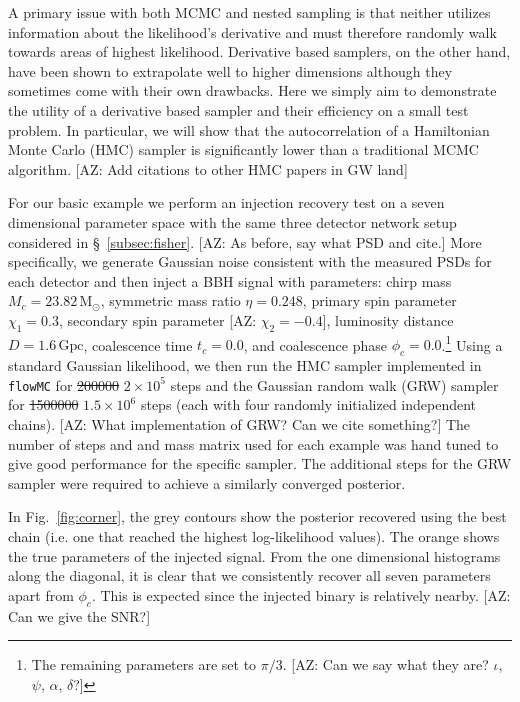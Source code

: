 \documentclass[twocolumn]{aastex631}
\newcommand{\flowMC}{\texttt{flowMC}\xspace}
\newcommand{\AZ}[1]{{\color{Burnt}[AZ: #1]}}
\begin{document}
A primary issue with both MCMC and nested sampling is that neither utilizes information about the likelihood's derivative and must therefore randomly walk towards areas of highest likelihood.
Derivative based samplers, on the other hand, have been shown to extrapolate well to higher dimensions although they sometimes come with their own drawbacks.
Here we simply aim to demonstrate the utility of a derivative based sampler and their efficiency on a small test problem.
In particular, we will show that the autocorrelation of a Hamiltonian Monte Carlo (HMC) sampler is significantly lower than a traditional MCMC algorithm.
\AZ{Add citations to other HMC papers in GW land}

For our basic example we perform an injection recovery test on a seven dimensional parameter space with the same three detector network setup considered in \S~\ref{subsec:fisher}.
\AZ{As before, say what PSD and cite.}
More specifically, we generate Gaussian noise consistent with the measured PSDs for each detector and then inject a BBH signal with parameters: chirp mass $M_c = 23.82\,\mathrm{M_\odot}$,  symmetric mass ratio $\eta = 0.248$, primary spin parameter $\chi_1=0.3$, secondary spin parameter \AZ{$\chi_2=-0.4$}, luminosity distance $D = 1.6\,\mathrm{Gpc}$, coalescence time $t_c = 0.0$, and coalescence phase $\phi_c = 0.0$.\footnote{
    The remaining parameters are set to $\pi/3$. \AZ{Can we say what they are? $\iota$, $\psi$, $\alpha$, $\delta$?}
}
Using a standard Gaussian likelihood, we then run the HMC sampler implemented in \flowMC for \sout{200000} $2\times10^5$ steps and the Gaussian random walk (GRW) sampler for \sout{1500000} $1.5\times10^6$ steps (each with four randomly initialized independent chains). 
\AZ{What implementation of GRW? Can we cite something?}
The number of steps and and mass matrix used for each example was hand tuned to give good performance for the specific sampler.
The additional steps for the GRW sampler were required to achieve a similarly converged posterior.

In Fig.~\ref{fig:corner}, the grey contours show the posterior recovered using the best chain (i.e. one that reached the highest log-likelihood values).
The orange shows the true parameters of the injected signal.
From the one dimensional histograms along the diagonal, it is clear that we consistently recover all seven parameters apart from $\phi_c$.
This is expected since the injected binary is relatively nearby.
\AZ{Can we give the SNR?}
\end{document}
